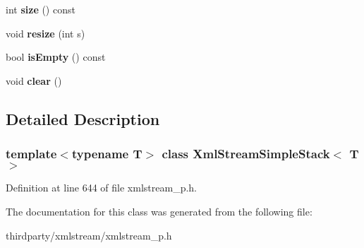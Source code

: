 \begin{DoxyCompactItemize}
\mbox{\label{class_xml_stream_simple_stack_ac2c7da0909c5beccbddbc5f468970ef6}} 
int {\bfseries size} () const
\item 
\mbox{\label{class_xml_stream_simple_stack_af65ff1b508c433ca57527f6daa815e4e}} 
void {\bfseries resize} (int s)
\item 
\mbox{\label{class_xml_stream_simple_stack_aedb0cb7867d011b40cee61b7d9b0f419}} 
bool {\bfseries is\+Empty} () const
\item 
\mbox{\label{class_xml_stream_simple_stack_a8a677ff1f011f57b8f096de489e4a75a}} 
void {\bfseries clear} ()
\end{DoxyCompactItemize}


\subsection{Detailed Description}
\subsubsection*{template$<$typename T$>$\newline
class Xml\+Stream\+Simple\+Stack$<$ T $>$}



Definition at line 644 of file xmlstream\+\_\+p.\+h.



The documentation for this class was generated from the following file\+:\begin{DoxyCompactItemize}
\item 
thirdparty/xmlstream/xmlstream\+\_\+p.\+h\end{DoxyCompactItemize}
